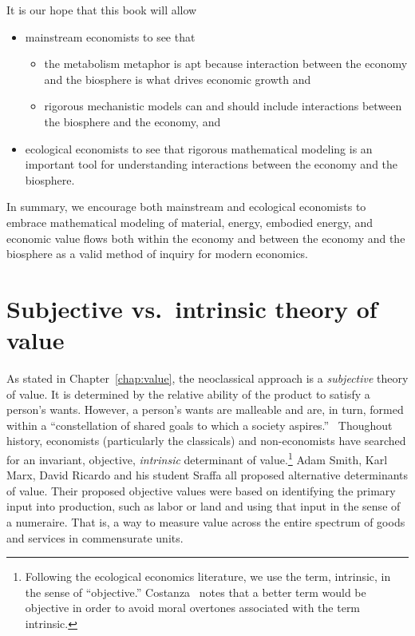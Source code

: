 It is our hope that this book will allow

\begin{itemize}
	\item{mainstream economists to see that}
	\begin{itemize}
		\item{the metabolism metaphor is apt because 
		interaction between the economy and the biosphere is 
		what drives economic growth and}
		\item{rigorous mechanistic models can and should include 
		interactions between the biosphere and the economy, and} 
	\end{itemize}
	\item{ecological economists to see that rigorous mathematical modeling
	is an important tool for understanding interactions
	between the economy and the biosphere.}
\end{itemize}

In summary, we encourage both mainstream and ecological economists
to embrace mathematical modeling of 
material, 
energy, 
embodied energy, 
and economic value flows
both within the economy and between the economy and the biosphere
as a valid method of inquiry for modern economics.



\section{Subjective vs.\ intrinsic theory of value}
\label{sec:theory of value}

As stated in Chapter~\ref{chap:value}, the neoclassical approach 
is a \emph{subjective} theory of value. 
It is determined by the relative ability of the product to satisfy a person’s wants. 
However, a person’s wants are malleable and are, in turn, formed within a 
``constellation of shared goals to which a society aspires.''~\cite{Costanza:2004we}
Thoughout history, economists (particularly the classicals) 
and non-economists have searched for an invariant, objective, 
\emph{intrinsic} determinant of value.\footnote{Following the ecological economics literature, 
we use the term, intrinsic, in the sense of ``objective.'' Costanza~\cite{Costanza:2004we} 
notes that a better term would be objective in order to avoid moral overtones associated 
with the term intrinsic.} 
Adam Smith, Karl Marx, David Ricardo and his student Sraffa all proposed 
alternative determinants of value.  
Their proposed objective values were based on identifying the primary input into production,
such as labor or land and using that input in the sense of a numeraire. 
That is, a way to measure value across the entire spectrum 
of goods and services in commensurate units.

